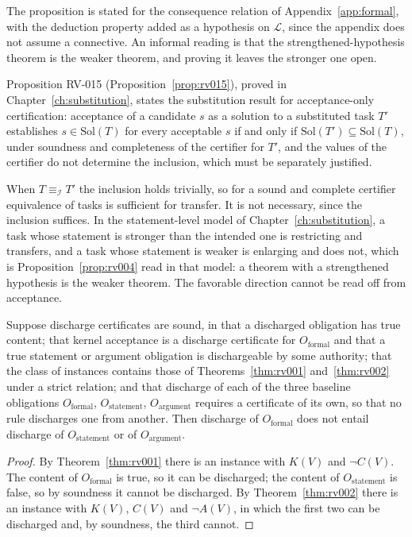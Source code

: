 The proposition is stated for the consequence relation of Appendix~\ref{app:formal}, with the deduction property added as a hypothesis on $\mathcal{L}$, since the appendix does not assume a connective. An informal reading is that the strengthened-hypothesis theorem is the weaker theorem, and proving it leaves the stronger one open.

Proposition RV-015 (Proposition~\ref{prop:rv015}), proved in Chapter~\ref{ch:substitution}, states the substitution result for acceptance-only certification: acceptance of a candidate $s$ as a solution to a substituted task $T'$ establishes $s \in \mathrm{Sol}(T)$ for every acceptable $s$ if and only if $\mathrm{Sol}(T') \subseteq \mathrm{Sol}(T)$, under soundness and completeness of the certifier for $T'$, and the values of the certifier do not determine the inclusion, which must be separately justified.

When $T \equiv_{\mathcal{I}} T'$ the inclusion holds trivially, so for a sound and complete certifier equivalence of tasks is sufficient for transfer. It is not necessary, since the inclusion suffices. In the statement-level model of Chapter~\ref{ch:substitution}, a task whose statement is stronger than the intended one is restricting and transfers, and a task whose statement is weaker is enlarging and does not, which is Proposition~\ref{prop:rv004} read in that model: a theorem with a strengthened hypothesis is the weaker theorem. The favorable direction cannot be read off from acceptance.

\begin{proposition}
\label{prop:rv016}
Suppose discharge certificates are sound, in that a discharged obligation has true content; that kernel acceptance is a discharge certificate for $O_{\mathrm{formal}}$ and that a true statement or argument obligation is dischargeable by some authority; that the class of instances contains those of Theorems~\ref{thm:rv001} and~\ref{thm:rv002} under a strict relation; and that discharge of each of the three baseline obligations $O_{\mathrm{formal}}$, $O_{\mathrm{statement}}$, $O_{\mathrm{argument}}$ requires a certificate of its own, so that no rule discharges one from another. Then discharge of $O_{\mathrm{formal}}$ does not entail discharge of $O_{\mathrm{statement}}$ or of $O_{\mathrm{argument}}$.
\end{proposition}

\begin{proof}
By Theorem~\ref{thm:rv001} there is an instance with $K(V)$ and $\neg C(V)$. The content of $O_{\mathrm{formal}}$ is true, so it can be discharged; the content of $O_{\mathrm{statement}}$ is false, so by soundness it cannot be discharged. By Theorem~\ref{thm:rv002} there is an instance with $K(V)$, $C(V)$ and $\neg A(V)$, in which the first two can be discharged and, by soundness, the third cannot.
\end{proof}

